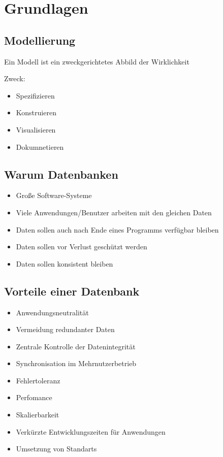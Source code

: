 \section{Grundlagen}
\subsection{Modellierung}
Ein Modell ist ein zweckgerichtetes Abbild der Wirklichkeit

Zweck:
\begin{itemize}
	\item Spezifizieren
	\item Konstruieren
	\item Visualisieren
	\item Dokumnetieren
\end{itemize}

\subsection{Warum Datenbanken}
\begin{itemize}
	\item Große Software-Systeme
	\item Viele Anwendungen/Benutzer arbeiten mit den gleichen Daten
	\item Daten sollen auch nach Ende eines Programms verfügbar bleiben
	\item Daten sollen vor Verlust geschützt werden
	\item Daten sollen konsistent bleiben 
\end{itemize}

\subsection{Vorteile einer Datenbank}
\begin{itemize}
	\item Anwendungsneutralität
	\item Vermeidung redundanter Daten
	\item Zentrale Kontrolle der Datenintegrität
	\item Synchronisation im Mehrnutzerbetrieb
	\item Fehlertoleranz
	\item Perfomance
	\item Skalierbarkeit
	\item Verkürzte Entwicklungszeiten für Anwendungen
	\item Umsetzung von Standarts 
\end{itemize}

